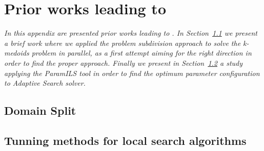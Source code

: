 \chapter{Prior works leading to \posl}
\label{chap:prior}
\textit{In this appendix are presented prior works leading to \posl. In Section~\ref{sec:split} we present a brief work where we applied the {\it problem subdivision} approach to solve the {\it k-medoids problem} in parallel, as a first attempt aiming for the right direction in order to find the proper approach. Finally we present in Section~\ref{sec:paramils} a study applying the {\sc ParamILS} tool in order to find the optimum parameter configuration to {\it Adaptive Search} solver.}

\vspace{2ex}\vfill
\minitoc
\newpage



%

\section{Domain Split}
\label{sec:split}




\section{Tunning methods for local search algorithms}
\label{sec:paramils}

